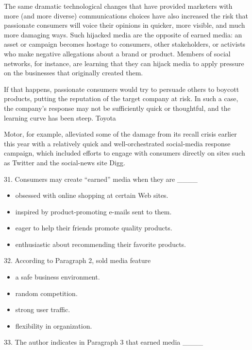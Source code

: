 \documentclass[UTF8,11pt]{ctexart}
\begin{document}
The same dramatic technological changes that have provided marketers with more (and more diverse) communications choices have also increased the risk that passionate consumers will voice their opinions in quicker, more visible, and much more damaging ways. Such hijacked media are the opposite of earned media: an asset or campaign becomes hostage to consumers, other stakeholders, or activists who make negative allegations about a brand or product. Members of social networks, for instance, are learning that they can hijack media to apply pressure on the businesses that originally created them.


If that happens, passionate consumers would try to persuade others to boycott products, putting the reputation of the target company at risk. In such a case, the company's response may not be sufficiently quick or thoughtful, and the learning curve has been steep. Toyota


Motor, for example, alleviated some of the damage from its recall crisis earlier this year with a relatively quick and well-orchestrated social-media response campaign, which included efforts to engage with consumers directly on sites such as Twitter and the social-news site Digg.


31. Consumers may create “earned” media when they are \_\_\_\_


\begin{itemize}[leftmargin=2em,itemsep=.2em,topsep=.4em]\item[A.] obsessed with online shopping at certain Web sites.
\item[B.] inspired by product-promoting e-mails sent to them.
\item[C.] eager to help their friends promote quality products.
\item[D.] enthusiastic about recommending their favorite products.
\end{itemize}

32. According to Paragraph 2, sold media feature


\begin{itemize}[leftmargin=2em,itemsep=.2em,topsep=.4em]\item[A.] a safe business environment.
\item[B.] random competition.
\item[C.] strong user traffic.
\item[D.] flexibility in organization.
\end{itemize}

33. The author indicates in Paragraph 3 that earned media \_\_\_\_
\end{document}
